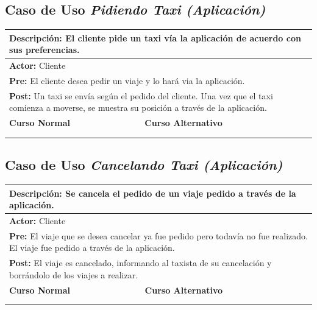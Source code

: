 \documentclass[a4paper]{article}
\begin{document}
\subsection{Caso de Uso \textit{Pidiendo Taxi (Aplicaci\'on)}}
\begin{center}
\begin{tabular}{|p{10cm} | p{6cm}|}
\hline
\multicolumn{2}{|p{15cm}|}{\textbf{Descripci\'on:} El cliente pide un taxi v\'ia la aplicaci\'on de acuerdo con sus preferencias. } \\
\hline
\multicolumn{2}{|p{15cm}|}{\textbf{Actor:} Cliente } \\
\hline
\multicolumn{2}{|p{15cm}|}{\textbf{Pre:} El cliente desea pedir un viaje y lo har\'a via la aplicaci\'on.} \\
\hline
\multicolumn{2}{|p{15cm}|}{\textbf{Post:} Un taxi se env\'ia seg\'un el pedido del cliente. Una vez que el taxi comienza a moverse, se muestra su posici\'on a trav\'es de la aplicaci\'on. }\\
\hline
\textbf{Curso Normal}  & \textbf{Curso Alternativo} \\ \hline

 & \\ \hline
 & \\ \hline
\end{tabular}
\end{center}


\subsection{Caso de Uso \textit{Cancelando Taxi (Aplicaci\'on)}}
\begin{center}
\begin{tabular}{|p{10cm} | p{6cm}|}
\hline
\multicolumn{2}{|p{16cm}|}{\textbf{Descripci\'on:} Se cancela el pedido de un viaje pedido a trav\'es de la aplicaci\'on.} \\
\hline
\multicolumn{2}{|l|}{\textbf{Actor:} Cliente} \\
\hline
\multicolumn{2}{|p{15cm}|}{\textbf{Pre:} El viaje que se desea cancelar ya fue pedido pero todav\'ia no fue realizado. El viaje fue pedido a trav\'es de la aplicaci\'on.} \\
\hline
\multicolumn{2}{|p{15cm}|}{\textbf{Post:} El viaje es cancelado, informando al taxista de su cancelaci\'on y borr\'andolo de los viajes a realizar.}\\
\hline
\textbf{Curso Normal}  & \textbf{Curso Alternativo} \\ \hline

 & \\ \hline
 & \\ \hline
\end{tabular}
\end{center}
\end{document}
